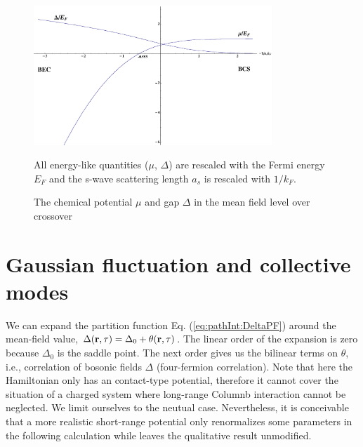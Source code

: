 \begin{figure}[htbp]
\begin{center}
\includegraphics[width=0.8\textwidth]{SingleChannelCrossoverMuDelta}
\caption{The chemical potential $\mu$ and gap $\Delta$ in the mean field level over crossover} 
\label{fig:pathInt:meanField}
{\small All energy-like quantities ($\mu$, $\Delta$) are rescaled with the Fermi energy $E_{F}$ and the s-wave scattering length $a_{s}$ is rescaled with $1/k_{F}$.  }
\end{center}
\end{figure}



\section{Gaussian fluctuation and collective modes}\label{sec:collective1}
We can expand the partition function Eq. (\ref{eq:pathInt:DeltaPF}) around the mean-field value, $\Delta(\mathbf{r},\tau)=\Delta_{0}+\theta(\mathbf{r},\tau)$. The linear order of the  expansion is zero because $\Delta_{0}$ is the saddle point.  The next order gives us the bilinear terms on $\theta$, i.e., correlation of bosonic fields $\Delta$ (four-fermion correlation).  Note that here the Hamiltonian only has an contact-type potential, therefore it cannot cover the situation of a charged system where long-range Columnb interaction cannot be neglected.  We limit ourselves to the neutual case.  Nevertheless, it is conceivable that a more realistic short-range potential only renormalizes some parameters in the following calculation while leaves the qualitative result unmodified.  

